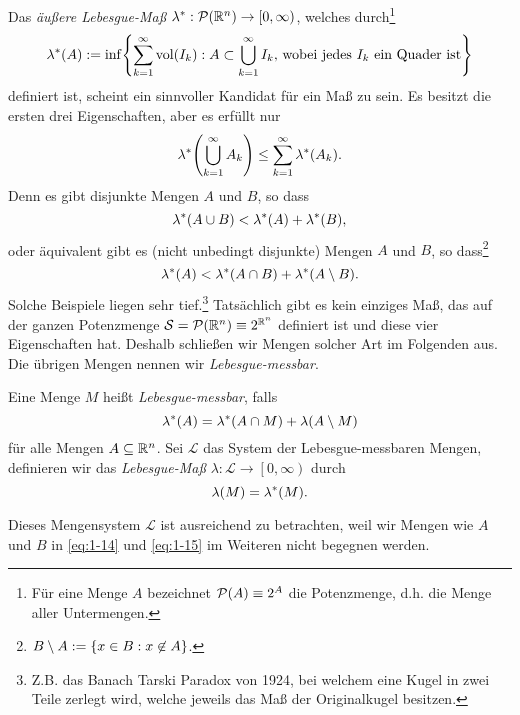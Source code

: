 Das \emph{äußere Lebesgue-Maß} \(\lambda^*: \mathcal{P}\parentheses*{\R^n} \to \left[0, \infty\right)\), welches durch\footnote{Für eine Menge \(A\) bezeichnet \(\mathcal{P}\parentheses*{A} \equiv 2^A\) die Potenzmenge, d.h. die Menge aller Untermengen.}
\[
	\lambda^*\parentheses*{A} := \inf\braces*{\sum_{k = 1}^\infty \vol\parentheses*{I_k} : A \subset \bigcup_{k = 1}^\infty I_k\text{, wobei jedes }I_k\text{ ein Quader ist}}
\]
definiert ist, scheint ein sinnvoller Kandidat für ein Maß zu sein.
Es besitzt die ersten drei Eigenschaften, aber es erfüllt nur
\begin{equation}\label{eq:1-13}
	\lambda^*\parentheses*{\bigcup_{k = 1}^\infty A_k} \le \sum_{k = 1}^\infty \lambda^*\parentheses*{A_k}.
\end{equation}
Denn es gibt disjunkte Mengen \(A\) und \(B\), so dass
\begin{equation}\label{eq:1-14}
	\lambda^*\parentheses*{A \cup B} < \lambda^*\parentheses*{A} + \lambda^*\parentheses*{B},
\end{equation}
oder äquivalent gibt es (nicht unbedingt disjunkte) Mengen \(A\) und \(B\), so dass\footnote{\(B \setminus A := \braces*{x \in B : x \not\in A}\).}
\begin{equation}\label{eq:1-15}
	\lambda^*\parentheses*{A} < \lambda^*\parentheses*{A \cap B} + \lambda^*\parentheses*{A \setminus B}.
\end{equation}
Solche Beispiele liegen sehr tief.\footnote{Z.B. das Banach Tarski Paradox von 1924, bei welchem eine Kugel in zwei Teile zerlegt wird, welche jeweils das Maß der Originalkugel besitzen.}
Tatsächlich gibt es kein einziges Maß, das auf der ganzen Potenzmenge \(\mathcal{S} = \mathcal{P}\parentheses*{\R^n} \equiv 2^{\R^n}\) definiert ist und diese vier Eigenschaften hat.
Deshalb schließen wir Mengen solcher Art im Folgenden aus.
Die übrigen Mengen nennen wir \emph{Lebesgue-messbar}.

\begin{definition}
	Eine Menge \(M\) heißt \emph{Lebesgue-messbar}, falls
	\[
		\lambda^*\parentheses*{A} = \lambda^*\parentheses*{A \cap M} + \lambda\parentheses*{A \setminus M}
	\]
	für alle Mengen \(A \subseteq \R^n\).
	Sei \(\mathcal{L}\) das System der Lebesgue-messbaren Mengen, definieren wir das \emph{Lebesgue-Maß} \(\lambda: \mathcal{L} \to \left[0, \infty\right)\) durch
	\[
		\lambda\parentheses*{M} = \lambda^*\parentheses*{M}.
	\]
\end{definition}

Dieses Mengensystem \(\mathcal{L}\) ist ausreichend zu betrachten, weil wir Mengen wie \(A\) und \(B\) in \eqref{eq:1-14} und \eqref{eq:1-15} im Weiteren nicht begegnen werden.


